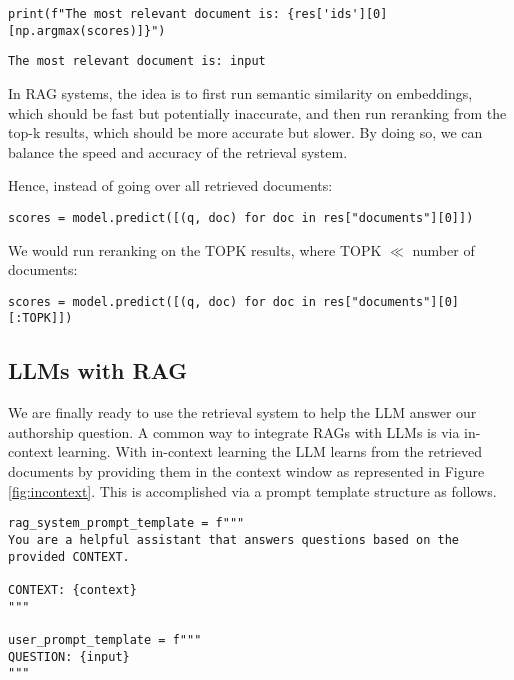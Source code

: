 \begin{verbatim}
print(f"The most relevant document is: {res['ids'][0][np.argmax(scores)]}")
\end{verbatim}

\begin{verbatim}
The most relevant document is: input
\end{verbatim}

In RAG systems, the idea is to first run semantic similarity on embeddings, which should be fast but potentially inaccurate, and then run reranking from the top-k results, which should be more accurate but slower. By doing so, we can balance the speed and accuracy of the retrieval system.

Hence, instead of going over all retrieved documents:
\begin{verbatim}
scores = model.predict([(q, doc) for doc in res["documents"][0]])
\end{verbatim}
We would run reranking on the TOPK results, where TOPK $\ll$ number of documents:
\begin{verbatim}
scores = model.predict([(q, doc) for doc in res["documents"][0][:TOPK]])
\end{verbatim}

\subsection{LLMs with RAG}

We are finally ready to use the retrieval system to help the LLM answer our authorship question. A common way to integrate RAGs with LLMs is via in-context learning. With in-context learning the LLM learns from the retrieved documents by providing them in the context window as represented in Figure \ref{fig:incontext}. This is accomplished via a prompt template structure as follows.

%

\begin{verbatim}
rag_system_prompt_template = f"""
You are a helpful assistant that answers questions based on the provided CONTEXT.

CONTEXT: {context}
"""

user_prompt_template = f"""
QUESTION: {input}
"""
\end{verbatim}

